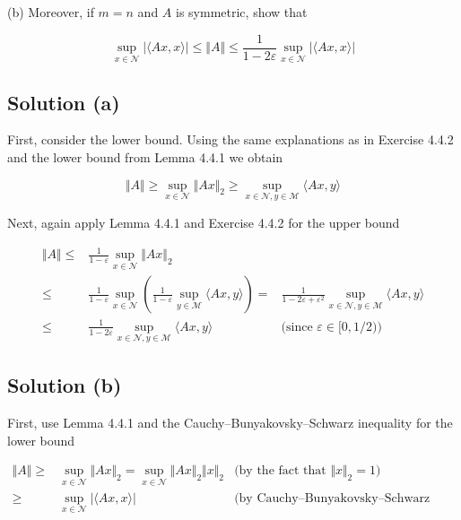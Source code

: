 \documentclass{article}
\begin{document}
(b) Moreover, if $m = n$ and $A$ is symmetric, show that

$$\sup_{x \in \mathcal N} | \langle Ax, x \rangle | \leq \Vert A \Vert \leq \frac{1}{1 - 2\varepsilon}\sup_{x \in \mathcal N} | \langle Ax, x \rangle |$$

\subsection{Solution (a)}

First, consider the lower bound. Using the same explanations as in Exercise 4.4.2 and the lower bound from Lemma 4.4.1 we obtain

$$\Vert A \Vert \geq\sup_{x \in \mathcal N} \Vert Ax \Vert_2 \geq \sup_{x \in \mathcal N, y \in \mathcal M} \langle Ax, y \rangle$$

Next, again apply Lemma 4.4.1 and Exercise 4.4.2 for the upper bound

\begin{equation*}
    \begin{aligned}
        \Vert A \Vert \leq & \frac{1}{1-\varepsilon}\sup_{x \in \mathcal N} \Vert Ax \Vert_2 \\
        \leq & \frac{1}{1-\varepsilon}\sup_{x \in \mathcal N}\left( \frac{1}{1-\varepsilon} \sup_{y \in \mathcal M} \langle Ax, y \rangle \right) = &\frac{1}{1 - 2\varepsilon + \varepsilon^2}\sup_{x \in \mathcal N, y \in \mathcal M}\langle Ax, y \rangle \\
        \leq & \frac{1}{1-2\varepsilon}\sup_{x \in \mathcal N, y \in \mathcal M}\langle Ax, y \rangle &\text{(since $\varepsilon \in [0,1/2)$)}
    \end{aligned}
\end{equation*}

\subsection{Solution (b)}

First, use Lemma 4.4.1 and the Cauchy–Bunyakovsky–Schwarz inequality for the lower bound

\begin{equation*}
    \begin{aligned}
        \Vert A \Vert \geq & \sup_{x \in \mathcal N} \Vert A x \Vert_2 = \sup_{x \in \mathcal N} \Vert Ax \Vert_2 \Vert x \Vert_2 &\text{(by the fact that $\Vert x \Vert_2 = 1$)} \\
        \geq & \sup_{x \in \mathcal N} | \langle Ax,  x \rangle | &\text{(by Cauchy–Bunyakovsky–Schwarz inequality)}
    \end{aligned}
\end{equation*}
\end{document}
